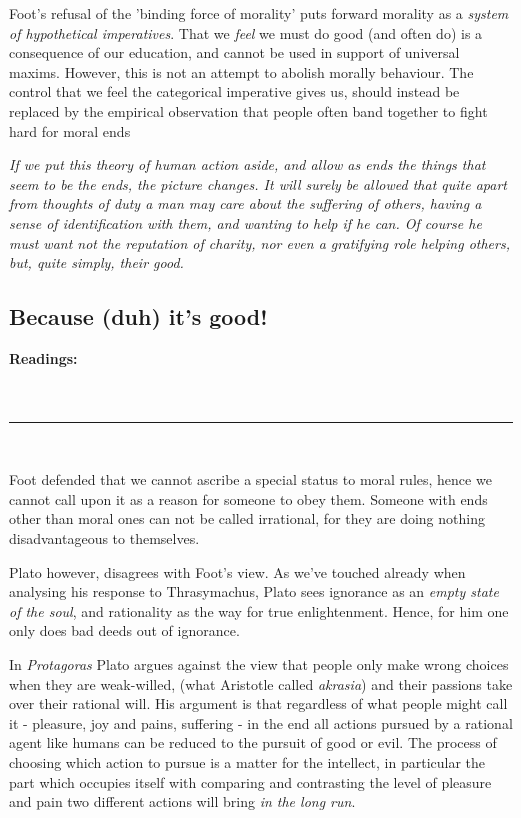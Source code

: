 \documentclass[english,course]{Notes}
\newcommand{\ita}[1]{\textit{#1}}
\newcommand\readings{\textbf{Readings:} \\}
\newcommand\sep{\\ \noindent\rule{10cm}{0.8pt} \\}
\newcommand\quo[1]{\begin{displayquote}\ita{\large{#1}}\end{displayquote}}
\begin{document}
\par{Foot's refusal of the 'binding force of morality' puts forward morality as a \ita{system of hypothetical imperatives}. That we \ita{feel} we must do good (and often do) is a consequence of our education, and cannot be used in support of universal maxims. However, this is not an attempt to abolish morally behaviour. The control that we feel the categorical imperative gives us, should instead be replaced by the empirical observation that people often band together to fight hard for moral ends 

\quo{If we put this theory of human action aside, and allow as ends the things that seem to be the ends, the picture changes. It will surely be allowed that quite apart from thoughts of duty a man may care about the suffering of others, having a sense of identification with them, and wanting to help if he can. Of course he must want not the reputation of charity, nor even a gratifying role helping others, but, quite simply, their good.}

\newpage
\subsection{Because (duh) it's good! }

\readings \cite{Protagoras} \\ \cite{AristotleVII}
\sep

\par{Foot defended that  we cannot ascribe a special status to moral rules, hence we cannot call upon it as a reason for someone to obey them. Someone with ends other than moral ones can not be called irrational, for they are doing nothing disadvantageous to themselves.}
\par{Plato however, disagrees with Foot's view. As we've touched already when analysing his response to Thrasymachus, Plato sees ignorance as an \ita{empty state of the soul}, and rationality as the way for true enlightenment. Hence, for him one only does bad deeds out of ignorance.}
\par{In \ita{Protagoras} Plato argues against the view that people only make wrong choices when they are weak-willed, (what Aristotle called \ita{akrasia}) and their passions take over their rational will. His argument is that regardless of what people might call it - pleasure, joy and pains, suffering - in the end all actions pursued by a rational agent like humans can be reduced to the pursuit of good or evil. The process of choosing which action to pursue is a matter for the intellect, in particular the part which occupies itself with comparing and contrasting the level of pleasure and pain two different actions will bring \ita{in the long run}.

}}
\end{document}
